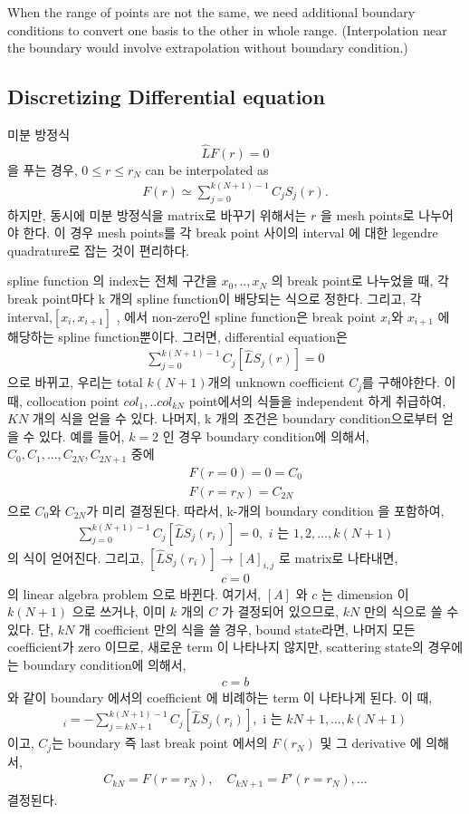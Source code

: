 \documentclass[10pt]{book}
\newcommand{\bea}{\begin{eqnarray}}
\newcommand{\eea}{\end{eqnarray}}
\newcommand{\no}{\nonumber \\}
\begin{document}
When the range of points are not the same, 
we need additional boundary conditions
to convert one basis to the other in whole range.
(Interpolation near the boundary would involve extrapolation 
without boundary condition.) 



\subsection{Discretizing Differential equation}
미분 방정식
$$\hat{L} F(r)=0 $$ 을 푸는 경우, $0\le r\le r_N$ can be interpolated as
\bea
F(r)\simeq \sum_{j=0}^{k(N+1)-1} C_j S_j(r).
\eea
하지만, 동시에 미분 방정식을
matrix로 바꾸기 위해서는 $r$ 을 mesh points로 나누어야 한다.
이 경우 mesh points를 각 break point 사이의 interval 에 대한
legendre quadrature로 잡는 것이 편리하다.

 spline function 의 index는
전체 구간을 $x_0,..,x_N$ 의 break point로 나누었을 때,
각 break point마다 k 개의 spline function이 배당되는
식으로 정한다. 그리고, 각 interval,$[x_i,x_{i+1}]$ , 
에서 non-zero인 spline function은 break point
$x_i$와 $x_{i+1}$ 에 해당하는 spline function뿐이다.  
그러면, differential equation은
\bea
\sum_{j=0}^{k(N+1)-1} C_j [\hat{L} S_j(r)]=0
\eea
으로 바뀌고, 우리는 total $k(N+1)$개의 unknown coefficient
$C_j$를 구해야한다. 이 때, collocation point $col_1,..col_{kN}$ 
point에서의 식들을 independent 하게 취급하여, $KN$ 개의
식을 얻을 수 있다. 나머지, k 개의 조건은 boundary 
condition으로부터 얻을 수 있다.
예를 들어, $k=2$ 인 경우 boundary condition에 의해서,
$C_0,C_1,...,C_{2N},C_{2N+1}$ 중에
\bea
& &F(r=0)=0=C_0\no
& &F(r=r_N)=C_{2N} 
\eea
으로 $C_0$와 $C_{2N}$가 미리 결정된다. 
따라서, k-개의 boundary condition 을 포함하여, 
\bea
\sum_{j=0}^{k(N+1)-1} C_j [\hat{L} S_j(r_i)]=0,\mbox{
 $i$ 는 $1,2,\dots,k(N+1)$}
\eea
의 식이 얻어진다. 그리고, $[\hat{L} S_j(r_i)]\to [A]_{i,j}$
로 matrix로 나타내면,
\bea
[A]c=0
\eea
의 linear algebra problem 으로 바뀐다. 여기서,
$[A]$ 와 $c$ 는 dimension 이 $k(N+1)$ 으로 쓰거나,
이미 $k$ 개의 $C$ 가 결정되어 있으므로, $kN$ 만의 
식으로 쓸 수 있다. 단, $kN$ 개 coefficient 만의
식을 쓸 경우, bound state라면, 나머지 모든 coefficient가 
zero 이므로, 새로운 term 이 나타나지 않지만,
scattering state의 경우에는 boundary condition에 의해서,
\bea
[A]c=b
\eea
와 같이 boundary 에서의 coefficient 에 비례하는 
term 이 나타나게 된다.
이 때, 
\bea
[b]_i=-\sum_{j=kN+1}^{k(N+1)-1} C_j[\hat{L} S_j(r_i)],
\mbox{ i 는 $kN+1,\dots,k(N+1)$}
\eea
이고, $C_j$는 boundary 즉 last break point 에서의 
$F(r_N)$ 및 그 derivative 에 의해서,
\bea
C_{kN}=F(r=r_N),\quad C_{kN+1}=F'(r=r_N),\dots
\eea
결정된다. 
\end{document}
